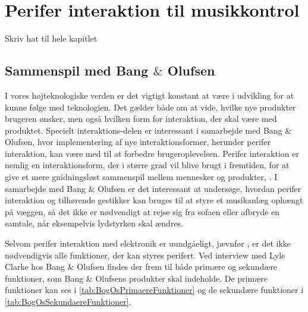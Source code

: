 \chapter{Perifer interaktion til musikkontrol}
\label{PeriferInteraktionTilMusikKontrol}
%
Skriv hat til hele kapitlet

\section{Sammenspil med Bang $\&$ Olufsen}
\label{SammenspilMedBO}
%
I vores højteknologiske verden er det vigtigt konstant at være i udvikling for at kunne følge med teknologien. Det gælder både om at vide, hvilke nye produkter brugeren ønsker, men også hvilken form for interaktion, der skal være med produktet. Specielt interaktions-delen er interessant i samarbejde med Bang $\&$ Olufsen, hvor implementering af nye interaktionsformer, herunder perifer interaktion, kan være med til at forbedre brugeroplevelsen. Perifer interaktion er nemlig en interaktionsform, der i større grad vil blive brugt i fremtiden, for at give et mere gnidningsløst sammenspil mellem mennesker og produkter, \parencite[s. 1]{PDF:PIIntroduction}. I samarbejde med Bang $\&$ Olufsen er det interessant at undersøge, hvordan perifer interaktion og tilhørende gestikker kan bruges til at styre et musikanlæg ophængt på væggen, så det ikke er nødvendigt at rejse sig fra sofaen eller afbryde en samtale, når eksempelvis lydstyrken skal ændres.

Selvom perifer interaktion med elektronik er uundgåeligt, jævnfør \textcite[s. 1]{PDF:PIIntroduction}, er det ikke nødvendigvis alle funktioner, der kan styres perifert. Ved interview med Lyle Clarke hos Bang $\&$ Olufsen findes der frem til både primære og sekundære funktioner, som Bang $\&$ Olufsens produkter skal indeholde. De primære funktioner kan ses i \autoref{tab:BogOsPrimaereFunktioner} og de sekundære funktioner i \autoref{tab:BogOsSekundaereFunktioner}.

